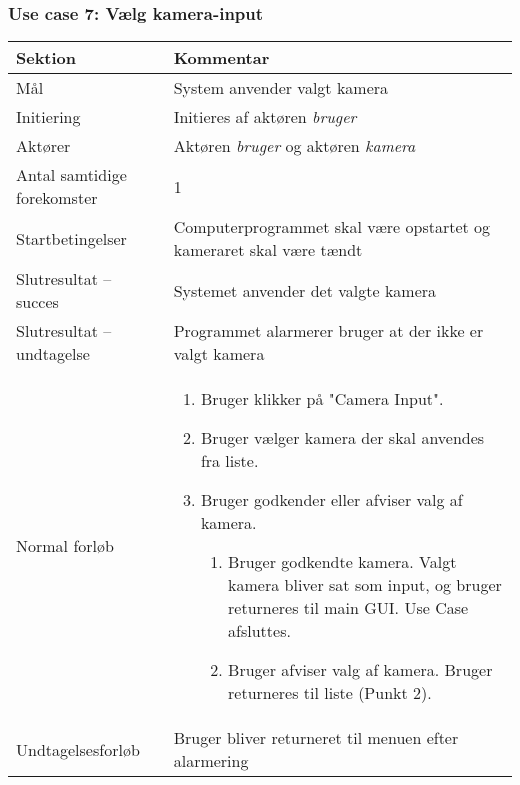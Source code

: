 \documentclass[kravspec.tex]{subfiles}
\begin{document}
	\subsubsection{Use case 7: Vælg kamera-input}
	\begin{tabular}{|l|p{7.7cm}|}
		\hline \textbf{Sektion} 	& \textbf{Kommentar} \\ 
		\hline Mål  & System anvender valgt kamera \\ 
		\hline Initiering  & Initieres af aktøren \textit{bruger} \\ 
		\hline Aktører & Aktøren \textit{bruger} og aktøren \textit{kamera} \\ 
		\hline Antal samtidige forekomster & 1 \\ 
		\hline Startbetingelser & Computerprogrammet skal være opstartet og kameraret skal være tændt  \\ 
		\hline Slutresultat – succes & Systemet anvender det valgte kamera \\ 
		\hline Slutresultat – undtagelse & Programmet alarmerer bruger at der ikke er valgt kamera \\ 
		\hline Normal forløb & \begin{enumerate}
			\item Bruger klikker på "Camera Input".
			\item Bruger vælger kamera der skal anvendes fra liste.
			\item Bruger godkender eller afviser valg af kamera.
			\begin{enumerate}
			\item Bruger godkendte kamera. Valgt kamera bliver sat som input, og bruger returneres til main GUI. Use Case afsluttes.
			\item Bruger afviser valg af kamera. Bruger returneres til liste (Punkt 2).
			\end{enumerate}
		\end{enumerate} \\ 
		\hline Undtagelsesforløb & Bruger bliver returneret til menuen efter alarmering \\ 
		\hline 
	\end{tabular}
	
\end{document}
